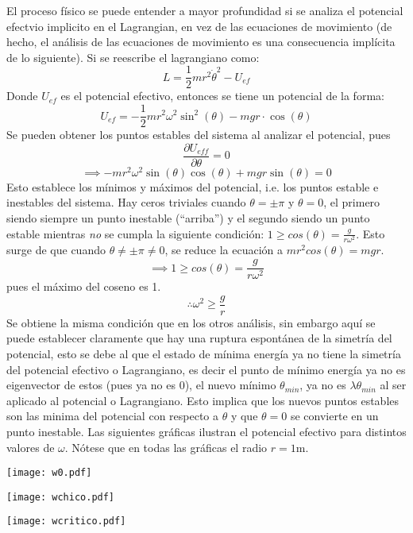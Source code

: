 \documentclass[12p]{article}
\begin{document}
\noindent El proceso físico se puede entender a mayor profundidad si se analiza el potencial efectvio implicito en el Lagrangian, en vez de las ecuaciones de movimiento (de hecho, el análisis de las ecuaciones de movimiento es una consecuencia implícita de lo siguiente). Si se reescribe el lagrangiano como: $$L = \frac{1}{2}mr^2\dot{\theta}^2 - U_{ef}$$
Donde $U_{ef}$ es el potencial efectivo, entonces se tiene un potencial de la forma:
$$U_{ef} = - \frac{1}{2}mr^2\omega^2 \sin^2(\theta) - mgr\cdot \cos(\theta)$$
Se pueden obtener los puntos estables del sistema al analizar el potencial, pues
$$\frac{\partial U_{eff}}{\partial\theta} = 0$$
$$\implies -mr^2\omega^2\sin(\theta)\cos(\theta) + mgr\sin(\theta) = 0$$
Esto establece los mínimos y máximos del potencial, i.e. los puntos estable e inestables del sistema. Hay ceros triviales cuando  $\theta = \pm \pi$ y $\theta = 0$, el primero siendo siempre un punto inestable (``arriba'') y el segundo siendo un punto estable mientras \emph{no} se cumpla la siguiente condición: $1 \geq cos(\theta) = \frac{g}{r\omega^2}$. Esto surge de que cuando $\theta \neq \pm \pi \neq 0$, se reduce la ecuación a $mr^2cos(\theta) = mgr$.
$$\implies 1 \geq cos(\theta) = \frac{g}{r\omega^2}$$ pues el máximo del coseno es 1.
$$\therefore \omega^2 \geq \frac{g}{r}$$
Se obtiene la misma condición que en los otros análisis, sin embargo aquí se puede establecer claramente que hay una ruptura espontánea de la simetría del potencial, esto se debe al que el estado de mínima energía ya no tiene la simetría del potencial efectivo o Lagrangiano, es decir el punto de mínimo energía ya no es eigenvector de estos (pues ya no es 0), el nuevo mínimo $\theta_{min}$, ya no es $\lambda \theta_{min}$ al ser aplicado al potencial o Lagrangiano. Esto implica que los nuevos puntos estables son las minima del potencial con respecto a $\theta$ y que $\theta = 0$ se convierte en un punto inestable.
Las siguientes gráficas ilustran el potencial efectivo para distintos valores de $\omega$. Nótese que en todas las gráficas el radio $r = 1 \mathrm{m}$.

\begin{center}
\texttt{[image: w0.pdf]}
\end{center}

\begin{center}
\texttt{[image: wchico.pdf]}
\end{center}

\begin{center}
\texttt{[image: wcritico.pdf]}
\end{center}
\end{document}
